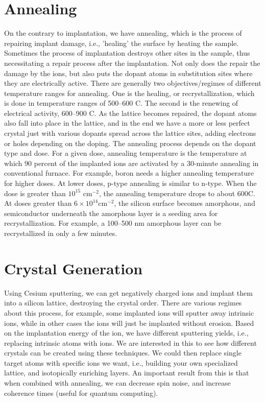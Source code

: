 \section{Annealing}
On the contrary to implantation, we have annealing, which is the process of repairing implant damage, i.e., 'healing' the surface by heating the sample.
Sometimes the process of implantation destroys other sites in the sample, thus necessitating a repair process after the implantation.
Not only does the repair the damage by the ions, but also puts the dopant atoms in substitution sites where they are electrically active.
There are generally two objectives/regimes of different temperature ranges for annealing.
One is the healing, or recrystallization, which is done in temperature ranges of 500--600 C.
The second is the renewing of electrical activity, 600--900 C.
As the lattice becomes repaired, the dopant atoms also fall into place in the lattice, and in the end we have a more or less perfect crystal just with various dopants spread across the lattice sites, adding electrons or holes depending on the doping.
The annealing process depends on the dopant type and dose.
For a given dose, annealing temperature is the temperature at which 90 percent of the implanted ions are activated by a 30-minute annealing in conventional furnace.
For example, boron needs a higher annealing temperature for higher doses.
At lower doses, p-type annealing is similar to n-type.
When the dose is greater than $10^{15}$ cm$^{-2}$, the annealing temperature drops to about 600C.
At doses greater than $6\times 10^{14}$cm$^{-2}$, the silicon surface becomes amorphous, and semiconductor underneath the amorphous layer is a seeding area for recrystallization.
For example, a 100--500 nm amorphous layer can be recrystallized in only a few minutes.
\section{Crystal Generation}
Using Cesium sputtering, we can get negatively charged ions and implant them into a silicon lattice, destroying the crystal order.
There are various regimes about this process, for example, some implanted ions will sputter away intrinsic ions, while in other cases the ions will just be implanted without erosion.
Based on the implantation energy of the ion, we have different sputtering yields, i.e., replacing intrinsic atoms with ions.
We are interested in this to see how different crystals can be created using these techniques.
We could then replace single target atoms with specific ions we want, i.e., building your own specialized lattice, and isotopically enriching layers.
An important result from this is that when combined with annealing, we can decrease spin noise, and increase coherence times (useful for quantum computing).
